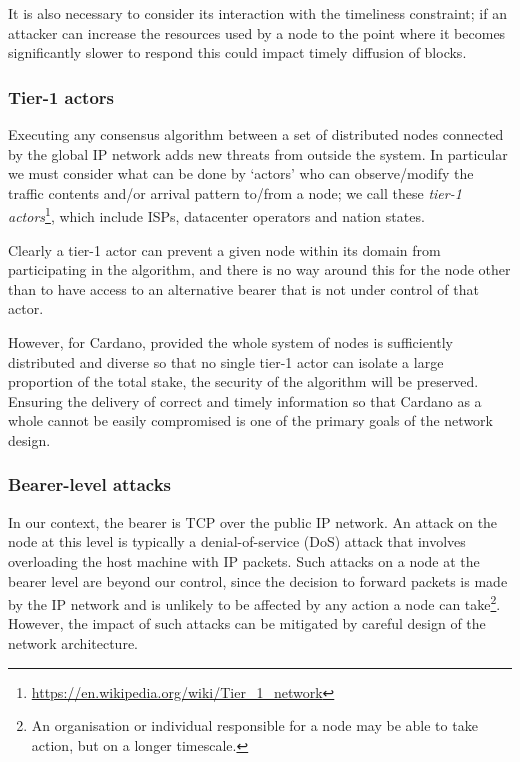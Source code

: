 \documentclass[11pt,a4paper]{article}
\begin{document}
It is also necessary to consider its interaction with the timeliness
constraint; if an attacker can increase the resources used by a node to
the point where it becomes significantly slower to respond this could
impact timely diffusion of blocks.

\subsubsection{Tier-1 actors}
\label{tier-1-actors}

Executing any consensus algorithm between a set of distributed nodes
connected by the global IP network adds new threats from outside the
system. In particular we must consider what can be done by `actors' who
can observe/modify the traffic contents and/or arrival pattern to/from a
node; we call these \emph{tier-1 actors}\footnote{\href{https://en.wikipedia.org/wiki/Tier_1_network}{{https://en.wikipedia.org/wiki/Tier\_1\_network}}},
which include ISPs, datacenter operators and nation states.

Clearly a tier-1 actor can prevent a given node within its domain from
participating in the algorithm, and there is no way around this for the
node other than to have access to an alternative bearer that is not
under control of that actor.

However, for Cardano, provided the whole system of nodes is sufficiently
distributed and diverse so that no single tier-1 actor can isolate a
large proportion of the total stake, the security of the algorithm will
be preserved. Ensuring the delivery of correct and timely information so
that Cardano as a whole cannot be easily compromised is one of the
primary goals of the network design.

\subsubsection{Bearer-level attacks}
\label{bearer-level-attacks}

In our context, the bearer is TCP over the public IP network. An attack
on the node at this level is typically a denial-of-service (DoS) attack
that involves overloading the host machine with IP packets. Such attacks
on a node at the bearer level are beyond our control, since the decision
to forward packets is made by the IP network and is unlikely to be
affected by any action a node can take\footnote{An organisation or
  individual responsible for a node may be able to take action, but on a
  longer timescale.}. However, the impact of such attacks can be
mitigated by careful design of the network architecture.
\end{document}
